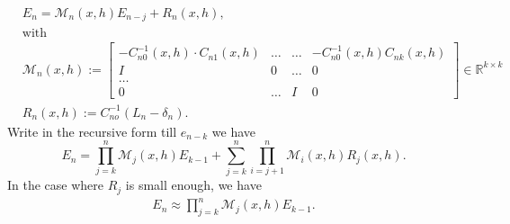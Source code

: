 \documentclass[a4paper,12pt,oneside,fleqn]{book}
\theoremstyle{definition}
\theoremstyle{remark}
\begin{document}
\begin{equation}
\begin{aligned}
	& E_n =   \mathcal{M}_n(x, h)E_{n - j} + R_n(x, h), \\
	& \text{with} \\
	& \mathcal{M}_n(x, h) :=
	\begin{bmatrix}
		-C_{n0}^{-1}(x, h) \cdot C_{n1}(x, h) & \dots & \dots &  -C_{n0}^{-1}(x, h) C_{nk}(x, h)\\
		I & 0 & \dots & 0\\
		\dots\\
		0 & \dots & I & 0  
	\end{bmatrix} \in \mathbb{R}^{k \times k} \\
	& R_n(x, h):= C_{no}^{-1}(L_n - \delta_n). 
\end{aligned}
\end{equation}
Write in the recursive form till $e_{n - k}$ we have
\begin{equation}
	E_n = \prod^n_{j = k} \mathcal{M}_j(x, h) E_{k -1} + \sum_{j = k}^n \prod^n_{i = j + 1} \mathcal{M}_i(x, h) R_j(x, h).
\end{equation}
In the case where $R_j$ is small enough, we have
\begin{align*}
	E_n \approx \prod_{j = k}^n \mathcal{M}_j(x, h) E_{k -1}.
\end{align*}
\end{document}
